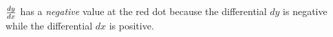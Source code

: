 $dy \over dx$ has a {\it negative} value at the red dot because the differential $dy$ is negative while the differential $dx$ is positive.











